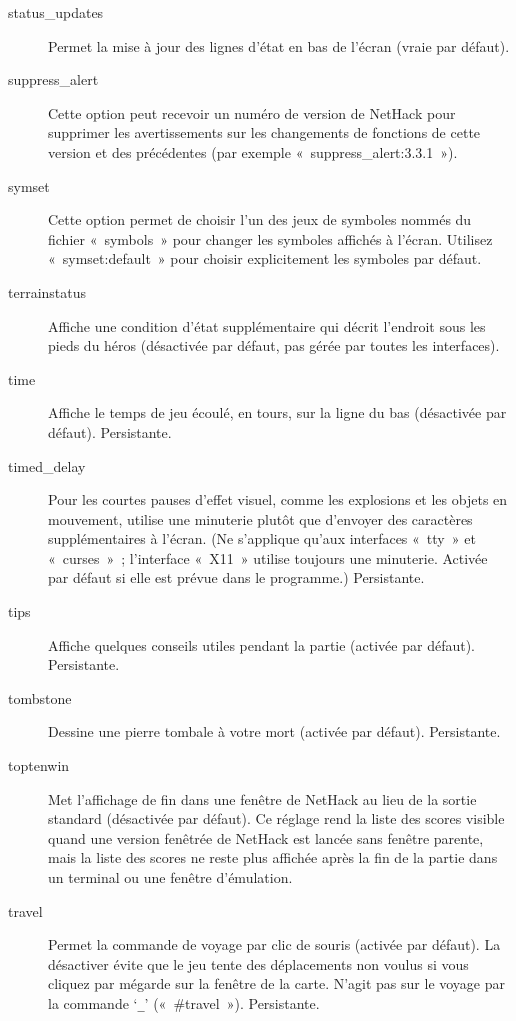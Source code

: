 \documentclass[titlepage]{article}
\begin{document}
\begin{description}
\item[{status\_updates}]
Permet la mise à jour des lignes d'état en bas de l'écran (vraie par
défaut).

\item[{suppress\_alert}]
Cette option peut recevoir un numéro de version de NetHack pour supprimer
les avertissements sur les changements de fonctions de cette version et
des précédentes (par exemple «~suppress\_alert:3.3.1~»).

\item[{symset}]
Cette option permet de choisir l'un des jeux de symboles nommés du fichier
«~symbols~» pour changer les symboles affichés à l'écran.
Utilisez «~symset:default~» pour choisir explicitement les symboles
par défaut.

\item[{terrainstatus}]
Affiche une condition d'état supplémentaire qui décrit l'endroit sous les
pieds du héros (désactivée par défaut, pas gérée par toutes les
interfaces).

\item[{time}]
Affiche le temps de jeu écoulé, en tours, sur la ligne du bas (désactivée
par défaut).
Persistante.

\item[{timed\_delay}]
Pour les courtes pauses d'effet visuel, comme les explosions et les objets
en mouvement, utilise une minuterie plutôt que d'envoyer des caractères
supplémentaires à l'écran.
(Ne s'applique qu'aux interfaces «~tty~» et «~curses~»~;
l'interface «~X11~» utilise toujours une minuterie.
Activée par défaut si elle est prévue dans le programme.)
Persistante.

\item[{tips}]
Affiche quelques conseils utiles pendant la partie (activée par défaut).
Persistante.

\item[{tombstone}]
Dessine une pierre tombale à votre mort (activée par défaut).
Persistante.

\item[{toptenwin}]
Met l'affichage de fin dans une fenêtre de NetHack au lieu de la sortie
standard (désactivée par défaut).
Ce réglage rend la liste des scores visible quand une version fenêtrée de
NetHack est lancée sans fenêtre parente, mais la liste des scores ne reste
plus affichée après la fin de la partie dans un terminal ou une fenêtre
d'émulation.

\item[{travel}]
Permet la commande de voyage par clic de souris (activée par défaut).
La désactiver évite que le jeu tente des déplacements non voulus si vous
cliquez par mégarde sur la fenêtre de la carte.
N'agit pas sur le voyage par la commande `\texttt{\_}'
(«~\#travel~»).
Persistante.


\end{description}
\end{document}
